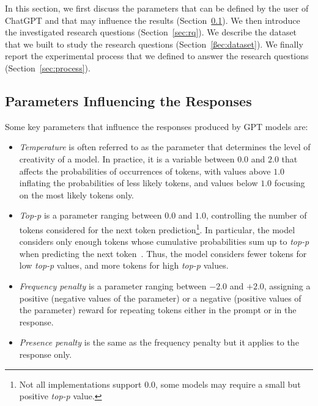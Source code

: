 In this section, we first discuss the parameters that can be defined by the user of ChatGPT and that may influence the results (Section~\ref{sec:parameters}). We then introduce the investigated research questions (Section~\ref{sec:rq}). We describe the dataset that we built to study the research questions (Section~\ref{ßec:dataset}). We finally report the experimental process that we defined to answer the research questions (Section~\ref{sec:process}).


\subsection{Parameters Influencing the Responses} \label{sec:parameters}

Some key parameters that influence the responses produced by GPT models are:
\begin{itemize}
\item \emph{Temperature} is often referred to as the parameter that determines the level of creativity of a model. In practice, it is a variable between $0.0$ and $2.0$ that affects the probabilities of occurrences of tokens, with values above $1.0$ inflating the probabilities of less likely tokens, and values below $1.0$ focusing on the most likely tokens only.

\item \emph{Top-p} is a parameter ranging between $0.0$ and $1.0$, controlling the number of tokens considered for the next token prediction\footnote{Not all implementations support $0.0$, some models may require a small but positive \emph{top-p} value.}. In particular, the model considers only enough tokens whose cumulative probabilities sum up to \emph{top-p} when predicting the next token~\cite{Holtzman:TopP:ICLR:2020}. Thus, the model considers fewer tokens for low \emph{top-p} values, and more tokens for high \emph{top-p} values. %

\item \emph{Frequency penalty} is a parameter ranging between $-2.0$ and $+2.0$, assigning a positive (negative values of the parameter) or a negative (positive values of the parameter) reward for repeating tokens either in the prompt or in the response.

\item \emph{Presence penalty} is the same as the frequency penalty but it applies to the response only.

\end{itemize}


